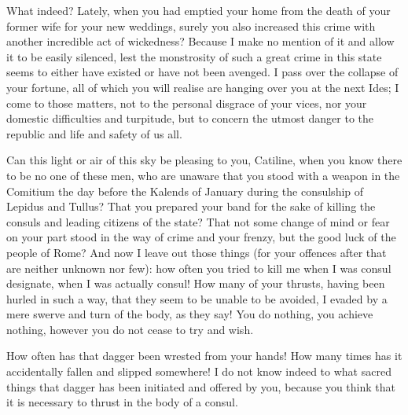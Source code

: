 {  What indeed? Lately, when you had emptied your home from the death of your former wife for your new weddings, surely you also increased this crime with another incredible act of wickedness? Because I make no mention of it and allow it to be easily silenced, lest the monstrosity of such a great crime in this state seems to either have existed or have not been avenged. I pass over the collapse of your fortune, all of which you will realise are hanging over you at the next Ides; I come to those matters, not to the personal disgrace of your vices, nor your domestic difficulties and turpitude, but to concern the utmost danger to the republic and life and safety of us all.

  Can this light or air of this sky be pleasing to you, Catiline, when you know there to be no one of these men, who are unaware that you stood with a weapon in the Comitium the day before the Kalends of January during the consulship of Lepidus and Tullus? That you prepared your band for the sake of killing the consuls and leading citizens of the state? That not some change of mind or fear on your part stood in the way of crime and your frenzy, but the good luck of the people of Rome? And now I leave out those things (for your offences after that are neither unknown nor few): how often you tried to kill me when I was consul designate, when I was actually consul! How many of your thrusts, having been hurled in such a way, that they seem to be unable to be avoided, I evaded by a mere swerve and turn of the body, as they say! You do nothing, you achieve nothing, however you do not cease to try and wish. 

How often has that dagger been wrested from your hands! How many times has it accidentally fallen and slipped somewhere! I do not know indeed to what sacred things that dagger has been initiated and offered by you, because you think that it is necessary to thrust in the body of a consul.
}
